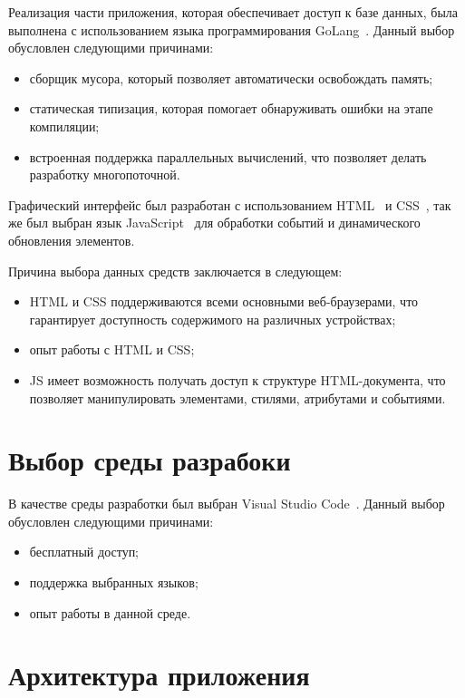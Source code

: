 Реализация части приложения,
которая обеспечивает доступ к базе данных, 
была выполнена с использованием языка программирования GoLang~\cite{golang}. 
Данный выбор обусловлен следующими причинами:

\begin{itemize}
    \item сборщик мусора, который позволяет автоматически
    освобождать память;
    \item статическая типизация, которая помогает 
    обнаруживать ошибки на этапе компиляции;
    \item встроенная поддержка параллельных вычислений, что
    позволяет делать разработку многопоточной.
\end{itemize}

Графический интерфейс был разработан с использованием HTML~\cite{html} и CSS~\cite{css},
так же был выбран язык JavaScript~\cite{jsLang} для 
обработки событий и динамического обновления элементов.

Причина выбора данных средств заключается в следующем:
\begin{itemize}
    \item HTML и CSS поддерживаются всеми основными веб-браузерами, 
    что гарантирует доступность содержимого на различных устройствах;
    \item опыт работы с HTML и CSS;
    \item JS имеет возможность получать доступ к структуре HTML-документа, 
    что позволяет манипулировать элементами, стилями, атрибутами и событиями.
\end{itemize}

\section{Выбор среды разрабоки}

В качестве среды разработки был выбран Visual Studio Code~\cite{vscode}. Данный выбор обусловлен
следующими причинами:
\begin{itemize}
    \item бесплатный доступ;
    \item поддержка выбранных языков;
    \item опыт работы в данной среде.
\end{itemize}

\section{Архитектура приложения}

